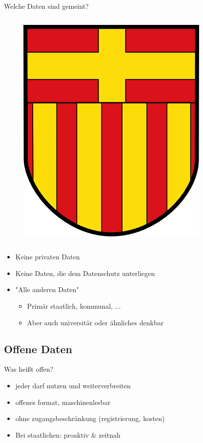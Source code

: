 \begin{frame}[t]{Welche Daten sind gemeint?}
\begin{columns}
 \begin{figure}[h]
  \centering
  \includegraphics[scale=0.3]{section_open_data_flag_paderborn.png}
 \end{figure}
\end{columns}
\end{frame}

\begin{frame}
\begin{itemize}
 \item Keine privaten Daten
 \item Keine Daten, die dem Datenschutz unterliegen
 \item "Alle anderen Daten"
 \begin{itemize}
  \item Primär staatlich, kommunal, ...
  \item Aber auch universitär oder ähnliches denkbar
 \end{itemize}
\end{itemize}
\end{frame}
\subsection{Offene Daten}
\begin{frame}[t]{Was heißt offen?}
 \begin{itemize}
   \item jeder darf nutzen und weiterverbreiten
   \item offenes format, maschinenlesbar
   \item ohne zugangsbeschränkung (registrierung, kosten)
   \item Bei staatlichen: proaktiv \& zeitnah
 \end{itemize}
\end{frame}

